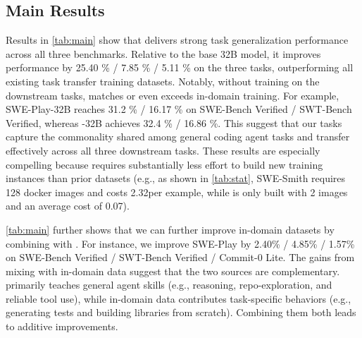 \subsection{Main Results}
Results in \autoref{tab:main} show that \hybridmethodname delivers strong task generalization performance across all three benchmarks. Relative to the base 32B model, it improves performance by 25.40 \% / 7.85 \% / 5.11 \% on the three tasks, outperforming all existing task transfer training datasets.
Notably, without training on the downstream tasks, \hybridmethodname matches or even exceeds in-domain training. For example, SWE-Play-32B reaches 31.2 \% / 16.17 \% on SWE-Bench Verified / SWT-Bench Verified, whereas \hybridmethodname-32B achieves 32.4 \% / 16.86 \%. 
This suggest that our tasks capture the commonality shared among general coding agent tasks and transfer effectively across all three downstream tasks.
These results are especially compelling because \hybridmethodname requires substantially less effort to build new training instances than prior datasets (e.g., as shown in \autoref{tab:stat}, SWE-Smith requires 128 docker images and costs 2.32\textcent per example, while \hybridmethodname is only built with 2 images and an average cost of 0.07\textcent).


\autoref{tab:main} further shows that we can further improve in-domain datasets by combining with \hybridmethodname. For instance, we improve SWE-Play by 2.40\% / 4.85\% / 1.57\% on SWE-Bench Verified / SWT-Bench Verified / Commit-0 Lite.
The gains from mixing \hybridmethodname with in-domain data suggest that the two sources are complementary. \hybridmethodname primarily teaches general agent skills (e.g., reasoning, repo-exploration, and reliable tool use), while in-domain data contributes task-specific behaviors (e.g., generating tests and building libraries from scratch). Combining them both leads to additive improvements.

